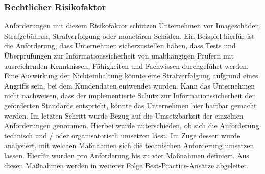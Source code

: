 \subsubsection{Rechtlicher Risikofaktor}
Anforderungen mit diesem Risikofaktor schützen Unternehmen vor Imageschäden, Strafgebühren, Strafverfolgung oder monetären Schäden. Ein Beispiel hierfür ist die Anforderung, dass Unternehmen sicherzustellen haben, dass Tests und Überprüfungen zur Informationssicherheit von unabhängigen Prüfern mit ausreichenden Kenntnissen, Fähigkeiten und Fachwissen durchgeführt werden. Eine Auswirkung der Nichteinhaltung könnte eine Strafverfolgung aufgrund eines Angriffs sein, bei dem Kundendaten entwendet wurden. Kann das Unternehmen nicht nachweisen, dass der implementierte Schutz zur Informationssicherheit den geforderten Standards entspricht, könnte das Unternehmen hier haftbar gemacht werden.
\bigbreak
Im letzten Schritt wurde Bezug auf die Umsetzbarkeit der einzelnen Anforderungen genommen. Hierbei wurde unterschieden, ob sich die Anforderung technisch und / oder organisatorisch umsetzen lässt. Im Zuge dessen wurde analysiert, mit welchen Maßnahmen sich die technischen Anforderung umsetzen lassen. Hierfür wurden pro Anforderung bis zu vier Maßnahmen definiert. Aus diesen Maßnahmen werden in weiterer Folge Best-Practice-Ansätze abgeleitet. 

